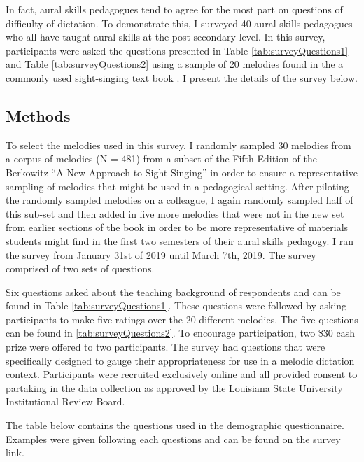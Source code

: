 \documentclass[12pt,]{book}
\begin{document}
In fact, aural skills pedagogues tend to agree for the most part on questions of difficulty of dictation.
To demonstrate this, I surveyed 40 aural skills pedagogues who all have taught aural skills at the post-secondary level.
In this survey, participants were asked the questions presented in Table \ref{tab:surveyQuestions1} and Table \ref{tab:surveyQuestions2} using a sample of 20 melodies found in the a commonly used sight-singing text book \citep{berkowitzNewApproachSight2011}.
I present the details of the survey below.

\hypertarget{methods}{%
\subsection{Methods}\label{methods}}

To select the melodies used in this survey, I randomly sampled 30 melodies from a corpus of melodies (N = 481) from a subset of the Fifth Edition of the Berkowitz ``A New Approach to Sight Singing'' \citep{berkowitzNewApproachSight2011} in order to ensure a representative sampling of melodies that might be used in a pedagogical setting.
After piloting the randomly sampled melodies on a colleague, I again randomly sampled half of this sub-set and then added in five more melodies that were not in the new set from earlier sections of the book in order to be more representative of materials students might find in the first two semesters of their aural skills pedagogy.
I ran the survey from January 31st of 2019 until March 7th, 2019.
The survey comprised of two sets of questions.

Six questions asked about the teaching background of respondents and can be found in Table \ref{tab:surveyQuestions1}.
These questions were followed by asking participants to make five ratings over the 20 different melodies.
The five questions can be found in \ref{tab:surveyQuestions2}.
To encourage participation, two \$30 cash prize were offered to two participants.
The survey had questions that were specifically designed to gauge their appropriateness for use in a melodic dictation context.
Participants were recruited exclusively online and all provided consent to partaking in the data collection as approved by the Louisiana State University Institutional Review Board.

The table below contains the questions used in the demographic questionnaire.
Examples were given following each questions and can be found on the survey link.
\end{document}
